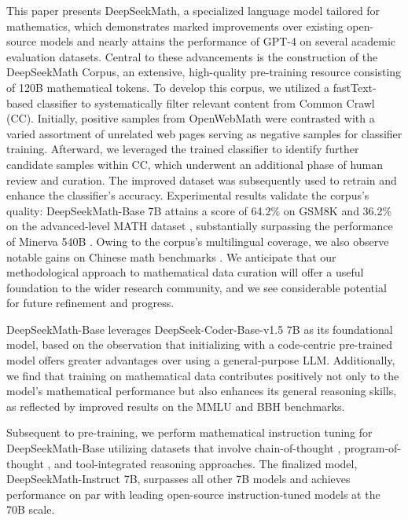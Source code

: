 This paper presents DeepSeekMath, a specialized language model tailored for mathematics, which demonstrates marked improvements over existing open-source models and nearly attains the performance of GPT-4 on several academic evaluation datasets. Central to these advancements is the construction of the DeepSeekMath Corpus, an extensive, high-quality pre-training resource consisting of 120B mathematical tokens. To develop this corpus, we utilized a fastText-based classifier \citep{joulin2016fasttext} to systematically filter relevant content from Common Crawl (CC). Initially, positive samples from OpenWebMath \citep{openwebmath} were contrasted with a varied assortment of unrelated web pages serving as negative samples for classifier training. Afterward, we leveraged the trained classifier to identify further candidate samples within CC, which underwent an additional phase of human review and curation. The improved dataset was subsequently used to retrain and enhance the classifier’s accuracy. Experimental results validate the corpus’s quality: DeepSeekMath-Base 7B attains a score of 64.2\% on GSM8K \citep{gsm8k} and 36.2\% on the advanced-level MATH dataset \citep{MATH}, substantially surpassing the performance of Minerva 540B \citep{minerva}. Owing to the corpus’s multilingual coverage, we also observe notable gains on Chinese math benchmarks \citep{wei2023cmath,agieval}. We anticipate that our methodological approach to mathematical data curation will offer a useful foundation to the wider research community, and we see considerable potential for future refinement and progress.

DeepSeekMath-Base leverages DeepSeek-Coder-Base-v1.5 7B \citep{deepseek-coder} as its foundational model, based on the observation that initializing with a code-centric pre-trained model offers greater advantages over using a general-purpose LLM. Additionally, we find that training on mathematical data contributes positively not only to the model's mathematical performance but also enhances its general reasoning skills, as reflected by improved results on the MMLU \citep{mmlu} and BBH \citep{bbh} benchmarks.

Subsequent to pre-training, we perform mathematical instruction tuning for DeepSeekMath-Base utilizing datasets that involve chain-of-thought \citep{cot}, program-of-thought \citep{pot,pal}, and tool-integrated reasoning \citep{tora} approaches. The finalized model, DeepSeekMath-Instruct 7B, surpasses all other 7B models and achieves performance on par with leading open-source instruction-tuned models at the 70B scale.

